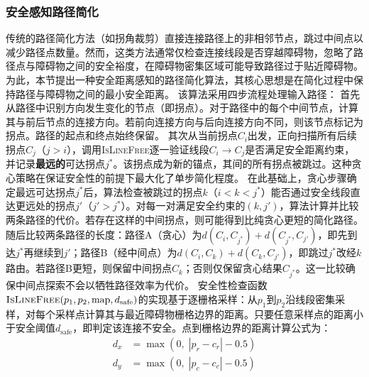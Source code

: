 \documentclass[lettersize,journal]{IEEEtran}
\begin{document}
\subsubsection{安全感知路径简化}
传统的路径简化方法（如拐角裁剪）直接连接路径上的非相邻节点，跳过中间点以减少路径点数量。然而，这类方法通常仅检查连接线段是否穿越障碍物，忽略了路径点与障碍物之间的安全裕度，在障碍物密集区域可能导致路径过于贴近障碍物。为此，本节提出一种安全距离感知的路径简化算法，其核心思想是在简化过程中保持路径与障碍物之间的最小安全距离。
该算法采用四步流程处理输入路径：
首先从路径中识别方向发生变化的节点（即拐点）。对于路径中的每个中间节点，计算其与前后节点的连接方向。若前向连接方向与后向连接方向不同，则该节点标记为拐点。路径的起点和终点始终保留。
其次从当前拐点$C_i$出发，正向扫描所有后续拐点$C_j$（$j > i$），调用\textsc{IsLineFree}逐一验证线段$C_i \to C_j$是否满足安全距离约束，并记录\textbf{最远的}可达拐点$j^{*}$。该拐点成为新的锚点，其间的所有拐点被跳过。这种贪心策略在保证安全性的前提下最大化了单步简化程度。
在此基础上，贪心步骤确定最远可达拐点$j^{*}$后，算法检查被跳过的拐点$k$（$i < k < j^{*}$）能否通过安全线段直达更远处的拐点$j'$（$j' > j^{*}$）。对每一对满足安全约束的$(k, j')$，算法计算并比较两条路径的代价。若存在这样的中间拐点，则可能得到比纯贪心更短的简化路径。
随后比较两条路径的长度：路径A（贪心）为$d(C_i, C_{j^{*}}) + d(C_{j^{*}}, C_{j'})$，即先到达$j^{*}$再继续到$j'$；路径B（经中间点）为$d(C_i, C_k) + d(C_k, C_{j'})$，即跳过$j^{*}$改经$k$路由。若路径B更短，则保留中间拐点$C_k$；否则仅保留贪心结果$C_{j^{*}}$。这一比较确保中间点探索不会以牺牲路径效率为代价。
安全性检查函数$\textsc{IsLineFree}(p_1, p_2, \mathrm{map}, d_{\mathrm{safe}})$的实现基于逐栅格采样：从$p_1$到$p_2$沿线段密集采样，对每个采样点计算其与最近障碍物栅格边界的距离。只要任意采样点的距离小于安全阈值$d_{\mathrm{safe}}$，即判定该连接不安全。点到栅格边界的距离计算公式为：
\begin{equation}
\begin{split}
d_x &= \max\left(0,\; |p_r - c_r| - 0.5\right)\\
d_y &= \max\left(0,\; |p_c - c_c| - 0.5\right)
\end{split}
\label{eq:dxymax}
\end{equation}
\end{document}

